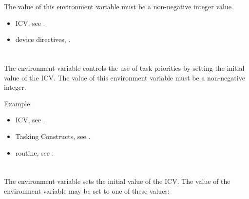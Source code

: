 The value of this environment variable must be a non-negative integer value.

\crossreferences
\begin{itemize}
\item {} ICV, see .

\item device directives, .
\end{itemize}


\section{}
\label{sec:OMP_MAX_TASK_PRIORITY}

The  environment variable controls the use of task
priorities by setting the initial value of the  ICV. The
value of this environment variable must be a non-negative integer.

Example:
\begin{ompEnv}
\end{ompEnv}

\crossreferences
\begin{itemize}
\item {} ICV, see .
\item Tasking Constructs, see .
\item {} routine, see .
\end{itemize}




\section{}
\label{sec:OMP_TARGET_OFFLOAD}
%
The  environment variable sets the initial value of the  ICV.
The value of the  environment variable may be set to one of these
values:

